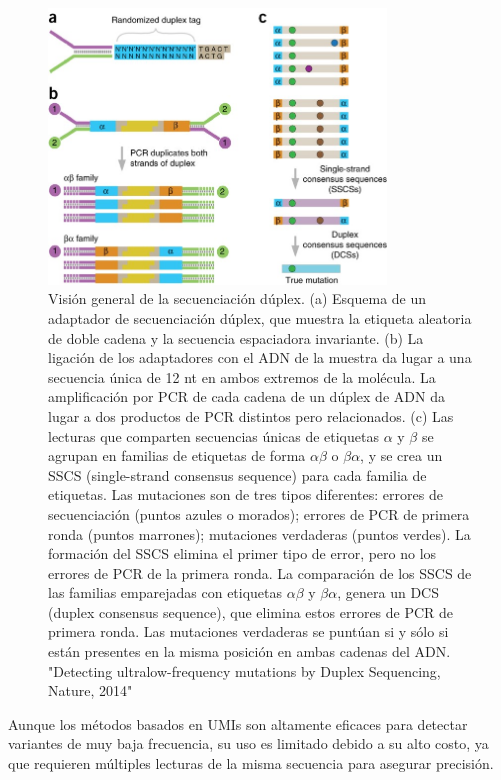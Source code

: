 \begin{figure}[htbp]
\centering
\includegraphics[width = 0.8\textwidth]{figs/duplex-sequencing.jpg}
\caption{Visión general de la secuenciación dúplex. (a) Esquema de un adaptador de secuenciación dúplex, que muestra la etiqueta aleatoria de doble cadena y la secuencia espaciadora invariante. (b) La ligación de los adaptadores con el ADN de la muestra da lugar a una secuencia única de 12 nt en ambos extremos de la molécula. La amplificación por PCR de cada cadena de un dúplex de ADN da lugar a dos productos de PCR distintos pero relacionados. (c) Las lecturas que comparten secuencias únicas de etiquetas $\alpha$ y $\beta$ se agrupan en familias de etiquetas de forma $\alpha \beta$ o $\beta \alpha$, y se crea un SSCS (single-strand consensus sequence) para cada familia de etiquetas. Las mutaciones son de tres tipos diferentes: errores de secuenciación (puntos azules o morados); errores de PCR de primera ronda (puntos marrones); mutaciones verdaderas (puntos verdes). La formación del SSCS elimina el primer tipo de error, pero no los errores de PCR de la primera ronda. La comparación de los SSCS de las familias emparejadas con etiquetas $\alpha \beta$ y $\beta \alpha$, genera un DCS (duplex consensus sequence), que elimina estos errores de PCR de primera ronda. Las mutaciones verdaderas se puntúan si y sólo si están presentes en la misma posición en ambas cadenas del ADN. "Detecting ultralow-frequency mutations by Duplex Sequencing, Nature, 2014"}
\end{figure}

Aunque los métodos basados en UMIs son altamente eficaces para detectar variantes de muy baja frecuencia, su uso es limitado debido a su alto costo, ya que requieren múltiples lecturas de la misma secuencia para asegurar precisión.

